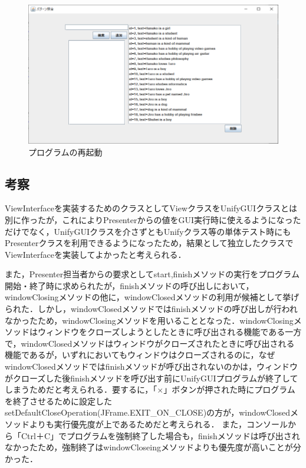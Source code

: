 \documentclass[12pt]{jarticle}
\begin{document}
\begin{figure}[!hbt]
  	\begin{center}
  		\includegraphics[scale=0.60]{images/scs2-3-5.png}
	\end{center}
  	\caption{プログラムの再起動}
\end{figure}
\clearpage

\subsection{考察}
ViewInterfaceを実装するためのクラスとしてViewクラスをUnifyGUIクラスとは別に作ったが，これによりPresenterからの値をGUI実行時に使えるようになっただけでなく，UnifyGUIクラスを介さずともUnifyクラス等の単体テスト時にもPresenterクラスを利用できるようになったため，結果として独立したクラスでViewInterfaceを実装してよかったと考えられる．

また，Presenter担当者からの要求としてstart,finishメソッドの実行をプログラム開始・終了時に求められたが，finishメソッドの呼び出しにおいて，windowClosingメソッドの他に，windowClosedメソッドの利用が候補として挙げられた．しかし，windowClosedメソッドではfinishメソッドの呼び出しが行われなかったため，windowClosingメソッドを用いることとなった．windowClosingメソッドはウィンドウをクローズしようとしたときに呼び出される機能である一方で，windowClosedメソッドはウィンドウがクローズされたときに呼び出される機能であるが，いずれにおいてもウィンドウはクローズされるのに，なぜwindowClosedメソッドではfinishメソッドが呼び出されないのかは，ウィンドウがクローズした後finishメソッドを呼び出す前にUnifyGUIプログラムが終了してしまうためだと考えられる．要するに，「×」ボタンが押された時にプログラムを終了させるために設定したsetDefaultCloseOperation(JFrame.EXIT\_ON\_CLOSE)の方が，windowClosedメソッドよりも実行優先度が上であるためだと考えられる．
また，コンソールから「Ctrl＋C」でプログラムを強制終了した場合も，finishメソッドは呼び出されなかったため，強制終了はwindowCloseingメソッドよりも優先度が高いことが分かった．
\end{document}
